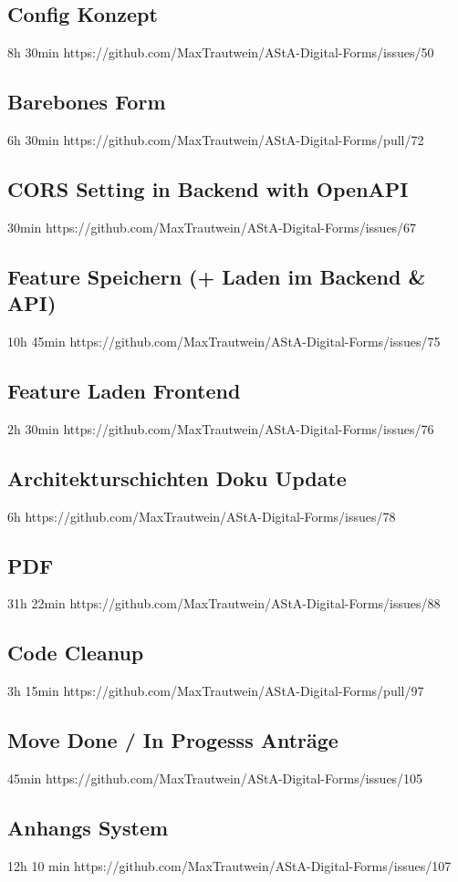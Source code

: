 \subsection{Config Konzept}
8h 30min
https://github.com/MaxTrautwein/AStA-Digital-Forms/issues/50

\subsection{Barebones Form}
6h 30min
https://github.com/MaxTrautwein/AStA-Digital-Forms/pull/72
\subsection{CORS Setting in Backend with OpenAPI}
30min
https://github.com/MaxTrautwein/AStA-Digital-Forms/issues/67
\subsection{Feature Speichern (+ Laden im Backend & API)}
10h 45min
https://github.com/MaxTrautwein/AStA-Digital-Forms/issues/75
\subsection{Feature Laden Frontend}
2h 30min
https://github.com/MaxTrautwein/AStA-Digital-Forms/issues/76
\subsection{Architekturschichten Doku Update}
6h
https://github.com/MaxTrautwein/AStA-Digital-Forms/issues/78
\subsection{PDF}
31h 22min
https://github.com/MaxTrautwein/AStA-Digital-Forms/issues/88
\subsection{Code Cleanup}
3h 15min
https://github.com/MaxTrautwein/AStA-Digital-Forms/pull/97
\subsection{Move Done / In Progesss Anträge}
45min
https://github.com/MaxTrautwein/AStA-Digital-Forms/issues/105
\subsection{Anhangs System}
12h 10 min
https://github.com/MaxTrautwein/AStA-Digital-Forms/issues/107
